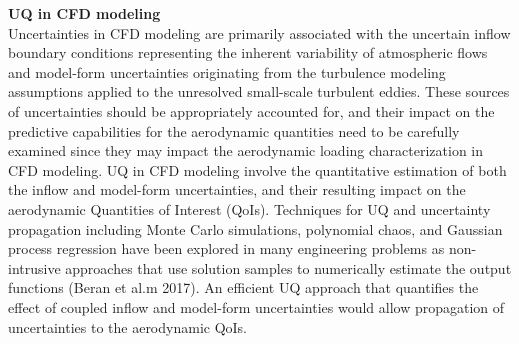 \noindent\textbf{UQ in CFD modeling} \\Uncertainties in CFD modeling are primarily associated with the uncertain inflow boundary conditions representing the inherent variability of atmospheric flows and model-form uncertainties originating from the turbulence modeling assumptions applied to the unresolved small-scale turbulent eddies. These sources of uncertainties should be appropriately accounted for, and their impact on the predictive capabilities for the aerodynamic quantities need to be carefully examined since they may impact the aerodynamic loading characterization in CFD modeling. UQ in CFD modeling involve the quantitative estimation of both the inflow and model-form uncertainties, and their resulting impact on the aerodynamic Quantities of Interest (QoIs). Techniques for UQ and uncertainty propagation including Monte Carlo simulations, polynomial chaos, and Gaussian process regression have been explored in many engineering problems as non-intrusive approaches that use solution samples to numerically estimate the output functions (Beran et al.m 2017). An efficient UQ approach that quantifies the effect of coupled inflow and model-form uncertainties would allow propagation of uncertainties to the aerodynamic QoIs.
